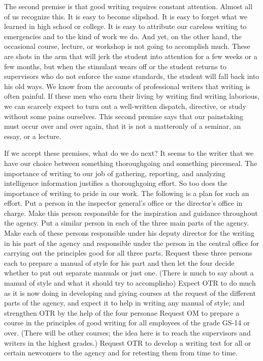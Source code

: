 \documentclass[
    oneside,
    11pt,
]{memoir}
\begin{document}
The second premise is that good writing requires constant attention. Almost all of us recognize this. It is easy to become slipshod. It is easy to forget what we learned in high school or college. It is easy to attribute our careless writing to emergencies and to the kind of work we do. And yet, on the other hand, the occasional course, lecture, or workshop is not going to accomplish much. These are shots in the arm that will jerk the student into attention for a few weeks or a few months, but when the stimulant wears off or the student returns to supervisors who do not enforce the same standards, the student will fall back into his old ways. We know from the accounts of professional writers that writing is often painful. If these men who earn their living by writing find writing laborious, we can scarcely expect to turn out a well-written dispatch, directive, or study without some pains ourselves. This second premise says that our painstaking must occur over and over again, that it is not a matteronly of a seminar, an essay, or a lecture. 

If we accept these premises, what do we do next? It seems to the writer that we have our choice between something thoroughgoing and something piecemeal. The importance of writing to our job of gathering, reporting, and analyzing intelligence information justifies a thoroughgoing effort. So too does the importance of writing to pride in our work. The following is a plan for such an effort. Put a person in the inspector general's office or the director's office in charge. Make this person responsible for the inspiration and guidance throughout the agency. Put a similar person in each of the three main parts of the agency. Make each of these persons responsible under his deputy director for the writing in his part of the agency and responsible under the person in the central office for carrying out the principles good for all three parts. Request these three persons each to prepare a manual of style for his part and then let the four decide whether to put out separate manuals or just one. (There is much to say about a manual of style and what it should try to accomplisho) Expect OTR to do much as it is now doing in developing and giving courses at the request of the different parts of the agency, and expect it to help in writing any manual of style; and strengthen OTR by the help of the four personae Request OM to prepare a course in the principles of good writing for all employees of the grade GS-14 or over. (There will be other courses; the idea here is to reach the supervisors and writers in the highest grades.) Request OTR to develop a writing test for all or certain newcomers to the agency and for retesting them from time to time. 
\end{document}
